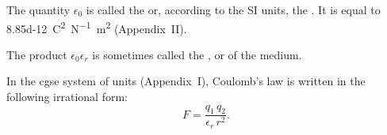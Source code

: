 The quantity $\epsilon_{0}$ is called the  or, according to the SI units, the . It is equal to \SI{8.85d-12}{\coulomb\squared\per\newton\meter\squared} (Appendix~II).

The product $\epsilon_{0} \epsilon_{r}$ is sometimes called the , or  of the medium.

In the cgse system of units (Appendix~I), Coulomb's law is written in the following irrational form:
\begin{equation*}%
F = \frac{q_{1}\,q_{2}}{\epsilon_{r} \, r^{2}}.
\end{equation*}

